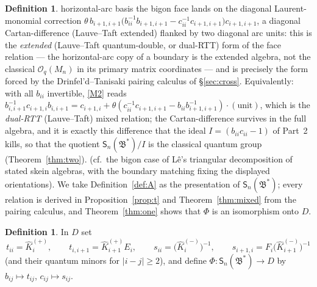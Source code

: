 \documentclass[11pt]{article}
\theoremstyle{definition}
\newtheorem{definition}[theorem]{Definition}
\theoremstyle{remark}
\newcommand{\B}{\mathfrak{B}}
\newcommand{\Sn}{\mathsf{S}_n}
\newcommand{\hK}{\hat K}
\newcommand{\tht}{\theta}
\begin{document}
\begin{definition}
horizontal-arc basis the bigon face lands on the diagonal
Laurent-monomial correction
$\tht\,b_{i+1,i+1}\bigl(b_{ii}^{-1}b_{i+1,i+1}
 -c_{ii}^{-1}c_{i+1,i+1}\bigr)c_{i+1,i+1}$,
a diagonal Cartan-difference (Lauve--Taft extended) flanked by two
diagonal arc units: this is the
\emph{extended} (Lauve--Taft quantum-double, or dual-RTT) form of
the face relation — the horizontal-arc copy of a boundary is the
extended algebra, not the classical $\mathcal O_q(M_n)$ in its
primary matrix coordinates — and is precisely the form forced by
the Drinfel'd--Tanisaki pairing calculus of \S\ref{sec:cross}.
Equivalently: with all $b_{ii}$ invertible, \eqref{M2} reads
$b_{i,i+1}^{-1}c_{i+1,i}b_{i,i+1}
=c_{i+1,i}+\tht(c_{ii}^{-1}c_{i+1,i+1}-b_{ii}b_{i+1,i+1}^{-1})
 \cdot(\text{unit})$,
which is the \emph{dual-RTT} (Lauve--Taft) mixed relation; the
Cartan-difference survives in the full algebra, and it is exactly
this difference that the ideal $I=(b_{ii}c_{ii}-1)$ of Part~2 kills,
so that the quotient $\Sn(\B^*)/I$ is the classical quantum group
(Theorem~\ref{thm:two}).
(cf.\ the bigon case of L\^e's triangular decomposition of stated
skein algebras, with the boundary matching fixing the displayed
orientations).  We take Definition~\ref{def:A} as the presentation
of $\Sn(\B^*)$; every relation is derived in
Proposition~\ref{prop:t} and Theorem~\ref{thm:mixed} from the
pairing calculus, and Theorem~\ref{thm:one} shows that $\Phi$ is an
isomorphism onto $D$.
\end{definition}

\begin{definition}\label{def:phi}
In $D$ set
\begin{equation}
t_{ii}=\hK_i^{(+)},\qquad
t_{i,i+1}=\hK_{i+1}^{(+)}E_i,\qquad
s_{ii}=\bigl(\hK_i^{(-)}\bigr)^{-1},\qquad
s_{i+1,i}=F_i\bigl(\hK_{i+1}^{(-)}\bigr)^{-1}
\label{arcimg}\tag{arc-img}
\end{equation}
(and their quantum minors for $|i-j|\ge2$), and define
$\Phi:\Sn(\B^*)\to D$ by $b_{ij}\mapsto t_{ij}$,
$c_{ij}\mapsto s_{ij}$.
\end{definition}
\end{document}
